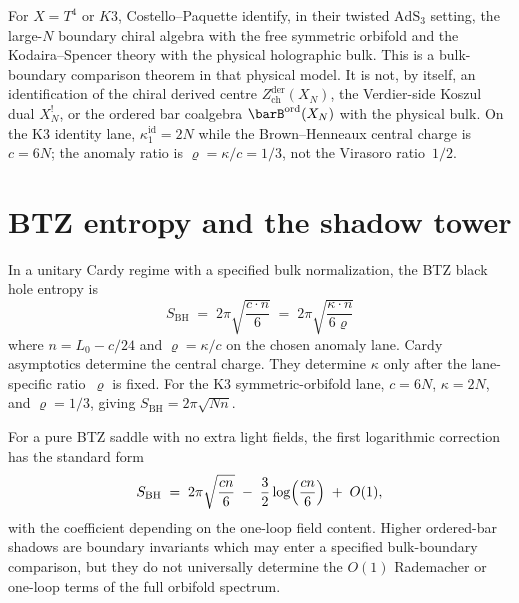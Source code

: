 For $X = T^4$ or $K3$, Costello--Paquette
\cite{CP2020} identify, in their twisted $\mathrm{AdS}_3$ setting,
the large-$N$ boundary chiral algebra with the free symmetric
orbifold and the Kodaira--Spencer theory with the physical
holographic bulk. This is a bulk-boundary comparison theorem in
that physical model. It is not, by itself, an identification of
the chiral derived centre $Z^{\mathrm{der}}_{\mathrm{ch}}(X_N)$,
the Verdier-side Koszul dual $X_N^!$, or the ordered bar coalgebra
$\barB^{\mathrm{ord}}(X_N)$ with the physical bulk. On the K3
identity lane, $\kappa^{\mathrm{id}}_1=2N$ while the
Brown--Henneaux central charge is $c=6N$; the anomaly ratio is
$\varrho=\kappa/c=1/3$, not the Virasoro ratio~$1/2$.



\section{BTZ entropy and the shadow tower}\label{sec:symn-btz}

In a unitary Cardy regime with a specified bulk normalization, the
BTZ black hole entropy is
\begin{equation}\label{eq:symn-btz}
 S_{\mathrm{BH}}
 \;=\; 2\pi\sqrt{\frac{c \cdot n}{6}}
 \;=\; 2\pi\sqrt{\frac{\kappa \cdot n}{6\varrho}}
\end{equation}
where $n=L_0-c/24$ and $\varrho=\kappa/c$ on the chosen anomaly
lane. Cardy asymptotics determine the central charge. They determine
$\kappa$ only after the lane-specific ratio~$\varrho$ is fixed. For
the K3 symmetric-orbifold lane, $c=6N$, $\kappa=2N$, and
$\varrho=1/3$, giving
$S_{\mathrm{BH}}=2\pi\sqrt{Nn}$.

\begin{remark}
\label{rem:symn-btz-log-corrections}
For a pure BTZ saddle with no extra light fields, the first
logarithmic correction has the standard form
\[
 S_{\mathrm{BH}}
 \;=\; 2\pi\sqrt{\frac{c n}{6}}
 \;-\; \frac{3}{2}\log\Bigl(\frac{c n}{6}\Bigr)
 \;+\; O(1),
\]
with the coefficient depending on the one-loop field content. Higher
ordered-bar shadows are boundary invariants which may enter a
specified bulk-boundary comparison, but they do not universally
determine the $O(1)$ Rademacher or one-loop terms of the full
orbifold spectrum.
\end{remark}


